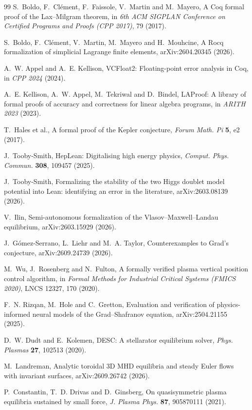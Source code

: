 \documentclass[11pt]{article}
\begin{document}
\begin{thebibliography}{99}
S.~Boldo, F.~Cl\'ement, F.~Faissole, V.~Martin and M.~Mayero, A Coq formal proof
of the Lax--Milgram theorem, in \emph{6th ACM SIGPLAN Conference on Certified
Programs and Proofs (CPP 2017)}, 79 (2017).

S.~Boldo, F.~Cl\'ement, V.~Martin, M.~Mayero and H.~Mouhcine, A Rocq
formalization of simplicial Lagrange finite elements, arXiv:2604.20345 (2026).

A.~W. Appel and A.~E. Kellison, VCFloat2: Floating-point error analysis in Coq,
in \emph{CPP 2024} (2024).

A.~E. Kellison, A.~W. Appel, M.~Tekriwal and D.~Bindel, LAProof: A library of
formal proofs of accuracy and correctness for linear algebra programs, in
\emph{ARITH 2023} (2023).

T.~Hales et al., A formal proof of the Kepler conjecture, \emph{Forum Math. Pi}
\textbf{5}, e2 (2017).

J.~Tooby-Smith, HepLean: Digitalising high energy physics, \emph{Comput. Phys.
Commun.} \textbf{308}, 109457 (2025).

J.~Tooby-Smith, Formalizing the stability of the two Higgs doublet model
potential into Lean: identifying an error in the literature, arXiv:2603.08139
(2026).

V.~Ilin, Semi-autonomous formalization of the Vlasov--Maxwell--Landau
equilibrium, arXiv:2603.15929 (2026).

J.~G\'omez-Serrano, L.~Liehr and M.~A. Taylor, Counterexamples to Grad's
conjecture, arXiv:2609.24739 (2026).

M.~Wu, J.~Rosenberg and N.~Fulton, A formally verified plasma vertical position
control algorithm, in \emph{Formal Methods for Industrial Critical Systems
(FMICS 2020)}, LNCS 12327, 170 (2020).

F.~N. Rizqan, M.~Hole and C.~Gretton, Evaluation and verification of
physics-informed neural models of the Grad--Shafranov equation,
arXiv:2504.21155 (2025).

D.~W. Dudt and E.~Kolemen, DESC: A stellarator equilibrium solver, \emph{Phys.
Plasmas} \textbf{27}, 102513 (2020).

M.~Landreman, Analytic toroidal 3D MHD equilibria and steady Euler flows with
invariant surfaces, arXiv:2609.26742 (2026).

P.~Constantin, T.~D. Drivas and D.~Ginsberg, On quasisymmetric plasma
equilibria sustained by small force, \emph{J. Plasma Phys.} \textbf{87},
905870111 (2021).

\end{thebibliography}
\end{document}
